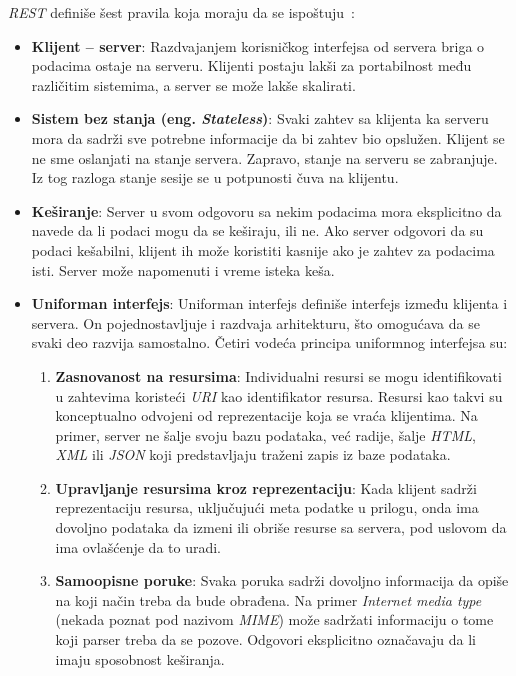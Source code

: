 \textit{REST} definiše šest pravila koja moraju da se ispoštuju~\cite{REST_API}:

\begin{itemize}

	\item \textbf{Klijent -- server}: Razdvajanjem korisničkog interfejsa od servera briga o podacima 
	ostaje na serveru. Klijenti postaju lakši za portabilnost među različitim sistemima, a server se može
    lakše skalirati.
	
    \item \textbf{Sistem bez stanja (eng. \textit{Stateless})}: Svaki zahtev sa klijenta ka serveru mora da sadrži 
	sve potrebne informacije da bi zahtev bio opslužen. Klijent se ne sme oslanjati na stanje servera. 
    Zapravo, stanje na serveru se zabranjuje. Iz tog razloga stanje sesije se u potpunosti čuva na klijentu.
	
    \item \textbf{Keširanje}: Server u svom odgovoru sa nekim podacima mora eksplicitno da navede da li 
    podaci mogu da se keširaju, ili ne. Ako server odgovori da su podaci kešabilni, klijent ih može 
    koristiti kasnije ako je zahtev za podacima isti. Server može napomenuti i vreme isteka keša.
    
    \item \textbf{Uniforman interfejs}: Uniforman interfejs definiše interfejs između klijenta i servera.
    On pojednostavljuje i razdvaja arhitekturu, što omogućava da se svaki deo razvija samostalno. 
    Četiri vodeća principa uniformnog interfejsa su:

    \begin{enumerate}
        \item \textbf{Zasnovanost na resursima}: Individualni resursi se mogu identifikovati u 
        zahtevima koristeći \textit{URI} kao identifikator resursa. Resursi kao takvi su konceptualno odvojeni 
        od reprezentacije koja se vraća klijentima. Na primer, server ne šalje svoju bazu podataka, 
        već radije, šalje \textit{HTML}, \textit{XML} ili \textit{JSON} koji predstavljaju traženi zapis iz baze podataka.

        \item \textbf{Upravljanje resursima kroz reprezentaciju}: Kada klijent sadrži reprezentaciju resursa,
        uključujući meta podatke u prilogu, onda ima dovoljno podataka da izmeni ili obriše resurse 
        sa servera, pod uslovom da ima ovlašćenje da to uradi.

        \item \textbf{Samoopisne poruke}: Svaka poruka sadrži dovoljno informacija da opiše na koji 
        način treba da bude obrađena. Na primer \textit{Internet media type} (nekada poznat pod nazivom \textit{MIME}) 
        može sadržati informaciju o tome koji parser treba da se pozove. Odgovori eksplicitno 
        označavaju da li imaju sposobnost keširanja.


\end{enumerate}
\end{itemize}
